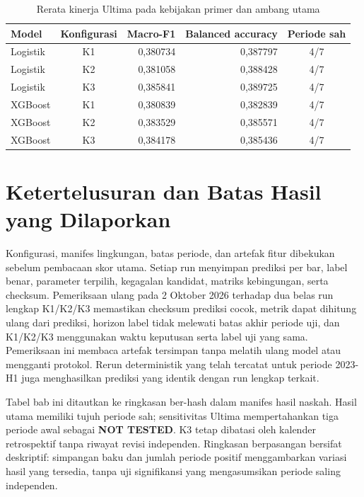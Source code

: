 \begin{table}[htbp]
\centering
\small
\setlength{\tabcolsep}{4pt}
\caption{Rerata kinerja Ultima pada kebijakan primer dan ambang utama}
\label{tab:hasil-ultima-rerata}
\begin{tabular}{lcrrc}
\toprule
Model & Konfigurasi & Macro-F1 & Balanced accuracy & Periode sah \\
\midrule
Logistik & K1 & 0,380734 & 0,387797 & 4/7 \\
Logistik & K2 & 0,381058 & 0,388428 & 4/7 \\
Logistik & K3 & 0,385841 & 0,389725 & 4/7 \\
XGBoost & K1 & 0,380839 & 0,382839 & 4/7 \\
XGBoost & K2 & 0,383529 & 0,385571 & 4/7 \\
XGBoost & K3 & 0,384178 & 0,385436 & 4/7 \\
\bottomrule
\end{tabular}
\end{table}


\section{Ketertelusuran dan Batas Hasil yang Dilaporkan}

Konfigurasi, manifes lingkungan, batas periode, dan artefak fitur dibekukan sebelum pembacaan skor utama. Setiap run menyimpan prediksi per bar, label benar, parameter terpilih, kegagalan kandidat, matriks kebingungan, serta checksum. Pemeriksaan ulang pada 2 Oktober 2026 terhadap dua belas run lengkap K1/K2/K3 memastikan checksum prediksi cocok, metrik dapat dihitung ulang dari prediksi, horizon label tidak melewati batas akhir periode uji, dan K1/K2/K3 menggunakan waktu keputusan serta label uji yang sama. Pemeriksaan ini membaca artefak tersimpan tanpa melatih ulang model atau mengganti protokol. Rerun deterministik yang telah tercatat untuk periode 2023-H1 juga menghasilkan prediksi yang identik dengan run lengkap terkait.

Tabel bab ini ditautkan ke ringkasan ber-hash dalam manifes hasil naskah. Hasil utama memiliki tujuh periode sah; sensitivitas Ultima mempertahankan tiga periode awal sebagai \textbf{NOT TESTED}. K3 tetap dibatasi oleh kalender retrospektif tanpa riwayat revisi independen. Ringkasan berpasangan bersifat deskriptif: simpangan baku dan jumlah periode positif menggambarkan variasi hasil yang tersedia, tanpa uji signifikansi yang mengasumsikan periode saling independen.
